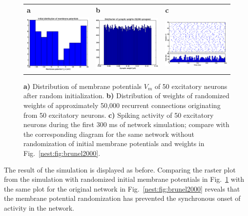\documentclass{article}
\begin{document}
\begin{figure}[tb]
\centering
\begin{tabular}{lll}
\textbf{a}  & \textbf{b} & \textbf{c}\\ 
\includegraphics[width=0.3\linewidth]{figures/rand_Vm.eps} &
\includegraphics[width=0.3\linewidth]{figures/rand_w.eps}  &
\includegraphics[width=0.3\linewidth]{figures/rand_raster.eps}
\end{tabular}
\caption{\label{nest:fig:rand_results} \textbf{a)} Distribution of membrane
  potentials $V_m$ of 50 excitatory neurons after random
  initialization. \textbf{b)} Distribution of weights of randomized
  weights of approximately 50,000 recurrent connections originating
  from 50 excitatory neurons. \textbf{c)} Spiking activity of 50
  excitatory neurons during the first 300 ms of network simulation;
  compare with the corresponding diagram for the same network without
  randomization of initial membrane potentials and weights in
  Fig.~\ref{nest:fig:brunel2000}.}
\end{figure}


The result of the simulation is displayed as before. Comparing the
raster plot from the simulation with randomized initial membrane
potentials in Fig.~\ref{nest:fig:rand_results} with the same plot for the
original network in Fig.~\ref{nest:fig:brunel2000} reveals that the
membrane potential randomization has prevented the synchronous onset
of activity in the network.
\end{document}
